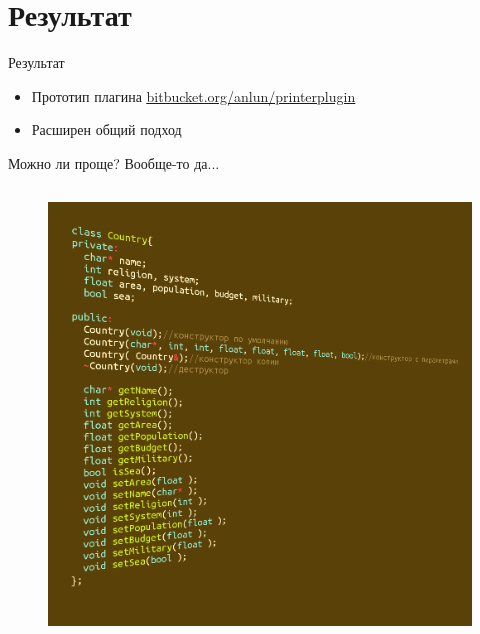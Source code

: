 \documentclass[sans]{beamer}
\begin{document}
\section{Результат}

\begin{frame}{Результат}
	\begin{itemize}
		\item Прототип плагина
			\newline
			\color{blue}\underline{\url{bitbucket.org/anlun/printerplugin}}
			\color{black}
		\item Расширен общий подход
	\end{itemize}
\end{frame}

\appendix

\begin{frame}{Можно ли проще?}
	Вообще-то да...
	\newline

	\begin{columns}
		\begin{column}{.4\textwidth}
			\begin{figure}
				\includegraphics[width = \linewidth]{images/country.png}
			\end{figure}
		\end{column}


\end{columns}
\end{frame}
\end{document}
